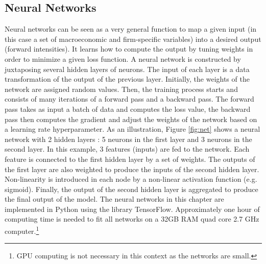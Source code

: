 \subsection{Neural Networks}
\label{SS:2-2}

Neural networks can be seen as a very general function to map a given input (in this case a set of macroeconomic and firm-specific variables) into a desired output (forward intensities). It learns how to compute the output by tuning weights in order to minimize a given loss function. A neural network is constructed by juxtaposing several hidden layers of neurons. The input of each layer is a data transformation of the output of the previous layer. Initially, the weights of the network are assigned random values. Then, the training process starts and consists of many iterations of a forward pass and a backward pass. The forward pass takes as input a batch of data and computes the loss value, the backward pass then computes the gradient and adjust the weights of the network based on a learning rate hyperparameter. As an illustration, Figure \ref{fig:net} shows a neural network with 2 hidden layers : 5 neurons in the first layer and 3 neurons in the second layer. In this example, 3 features (inputs) are fed to the network. Each feature is connected to the first hidden layer by a set of weights. The outputs of the first layer are also weighted to produce the inputs of the second hidden layer. Non-linearity is introduced in each node by a non-linear activation function (e.g. sigmoid). Finally, the output of the second hidden layer is aggregated to produce the final output of the model. The neural networks in this chapter are implemented in Python using the library TensorFlow. Approximately one hour of computing time is needed to fit all networks on a 32GB RAM quad core 2.7 GHz computer.\footnote{GPU computing is not necessary in this context as the networks are small.}

